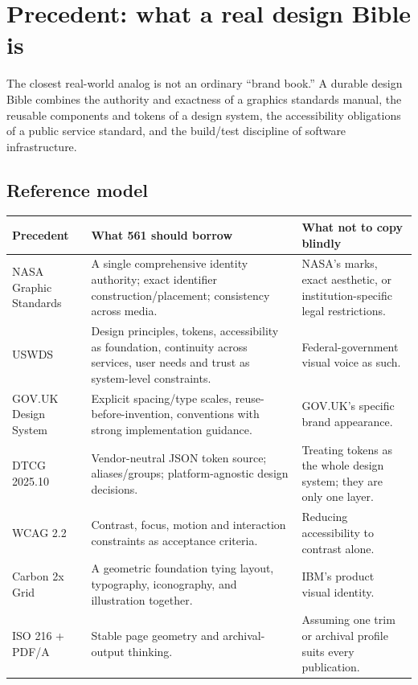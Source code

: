 \documentclass[11pt,twoside,openany]{report}
\begin{document}
\clearpage
{}

\chapter{Precedent: what a real design Bible is}

The closest real-world analog is not an ordinary ``brand book.'' A durable design Bible combines the authority and exactness of a graphics standards manual, the reusable components and tokens of a design system, the accessibility obligations of a public service standard, and the build/test discipline of software infrastructure.

\section{Reference model}
\begin{tabularx}{\textwidth}{@{}L{34mm}L{35mm}Y@{}}
\toprule
Precedent & What 561 should borrow & What not to copy blindly\\
\midrule
NASA Graphic Standards & A single comprehensive identity authority; exact identifier construction/placement; consistency across media. & NASA's marks, exact aesthetic, or institution-specific legal restrictions.\\
USWDS & Design principles, tokens, accessibility as foundation, continuity across services, user needs and trust as system-level constraints. & Federal-government visual voice as such.\\
GOV.UK Design System & Explicit spacing/type scales, reuse-before-invention, conventions with strong implementation guidance. & GOV.UK's specific brand appearance.\\
DTCG 2025.10 & Vendor-neutral JSON token source; aliases/groups; platform-agnostic design decisions. & Treating tokens as the whole design system; they are only one layer.\\
WCAG 2.2 & Contrast, focus, motion and interaction constraints as acceptance criteria. & Reducing accessibility to contrast alone.\\
Carbon 2x Grid & A geometric foundation tying layout, typography, iconography, and illustration together. & IBM's product visual identity.\\
ISO 216 + PDF/A & Stable page geometry and archival-output thinking. & Assuming one trim or archival profile suits every publication.\\
\bottomrule
\end{tabularx}
\end{document}
